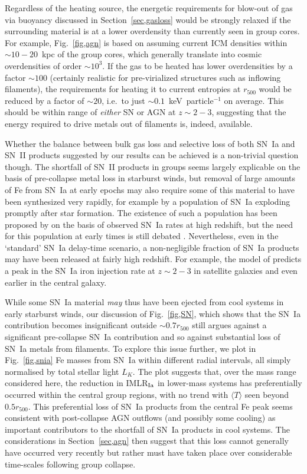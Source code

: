 \documentclass[useAMS,usenatbib]{mn2e}
\begin{document}
Regardless of the heating source, the energetic requirements for
blow-out of gas via buoyancy discussed in Section~\ref{sec,gasloss}
would be strongly relaxed if the surrounding material is at a lower
overdensity than currently seen in group cores. For example,
Fig.~\ref{fig,agn} is based on assuming current ICM densities within
$\sim 10-20$~kpc of the group cores, which generally translate into
cosmic overdensities of order $\sim 10^3$. If the gas to be heated has
lower overdensities by a factor $\sim 100$ (certainly realistic for
pre-virialized structures such as inflowing filaments), the
requirements for heating it to current entropies at $r_{500}$ would be
reduced by a factor of $\sim 20$, i.e.\ to just $\sim
0.1$~keV~particle$^{-1}$ on average. This should be within range of
{\em either} SN or AGN at $z\sim 2-3$, suggesting that the energy
required to drive metals out of filaments is, indeed, available.

Whether the balance between bulk gas loss and selective loss of both
SN~Ia and SN~II products suggested by our results can be achieved is a
non-trivial question though. The shortfall of SN~II products in groups
seems largely explicable on the basis of pre-collapse metal loss in
starburst winds, but removal of large amounts of Fe from SN~Ia at
early epochs may also require some of this material to have been
synthesized very rapidly, for example by a population of SN~Ia
exploding promptly after star formation. The existence of such a
population has been proposed by \citet*{mann06} on the basis of
observed SN~Ia rates at high redshift, but the need for this
population at early times is still debated \citep*{dahl08}. 
Nevertheless, even in the `standard' SN~Ia delay-time
scenario, a non-negligible fraction of SN~Ia products may have been
released at fairly high redshift. For example, the model of
\citet{cora06} predicts a peak in the SN~Ia iron injection rate at
$z\sim 2-3$ in satellite galaxies and even earlier in the central
galaxy.

While some SN~Ia material {\em may} thus have been ejected from cool
systems in early starburst winds, our discussion of Fig.~\ref{fig,SN},
which shows that the SN~Ia contribution becomes insignificant outside
$\sim 0.7r_{500}$ still argues against a significant pre-collapse
SN~Ia contribution and so against substantial loss of SN~Ia metals
from filaments. To explore this issue further, we plot in
Fig.~\ref{fig,snia} Fe masses from SN~Ia within different radial
intervals, all simply normalised by total stellar light $L_K$. The
plot suggests that, over the mass range considered here, the reduction
in IMLR$_{\rm Ia}$ in lower-mass systems has preferentially occurred
within the central group regions, with no trend with $\langle
T\rangle$ seen beyond $0.5r_{500}$. This preferential loss of SN~Ia
products from the central Fe peak seems consistent with post-collapse
AGN outflows (and possibly some cooling) as important contributors to
the shortfall of SN~Ia products in cool systems. The considerations in
Section~\ref{sec,agn} then suggest that this loss cannot generally
have occurred very recently but rather must have taken place over
considerable time-scales following group collapse.
\end{document}
